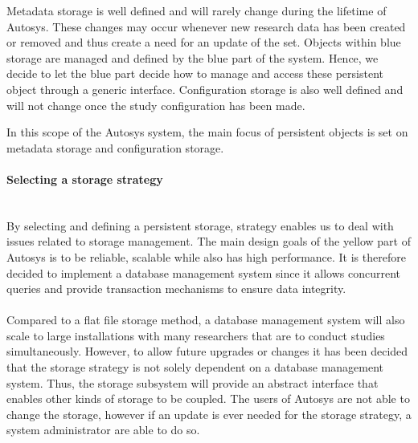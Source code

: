 Metadata storage is well defined and will rarely change during the lifetime of Autosys. These changes may occur whenever new research data has been created or removed and thus create a need for an update of the set. Objects within blue storage are managed and defined by the blue part of the system. Hence, we decide to let the blue part decide how to manage and access these persistent object through a generic interface. Configuration storage is also well defined and will not change once the study configuration has been made.

In this scope of the Autosys system, the main focus of persistent objects is set on metadata storage and configuration storage.

\paragraph{Selecting a storage strategy}\mbox{}\\
By selecting and defining a persistent storage, strategy enables us to deal with issues related to storage management. The main design goals of the yellow part of Autosys is to be reliable, scalable while also has high performance. It is therefore decided to implement a database management system since it allows concurrent queries and provide transaction mechanisms to ensure data integrity. \\\\Compared to a flat file storage method, a database management system will also scale to large installations with many researchers that are to conduct studies simultaneously. However, to allow future upgrades or changes it has been decided that the storage strategy is not solely dependent on a database management system. Thus, the storage subsystem will provide an abstract interface that enables other kinds of storage to be coupled. The users of Autosys are not able to change the storage, however if an update is ever needed for the storage strategy, a system administrator are able to do so. 

